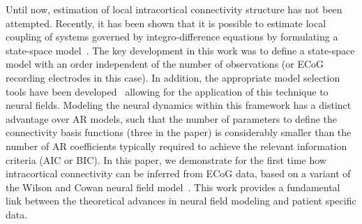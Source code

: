 \documentclass[onecolumn,draftcls]{IEEEtran}
\begin{document}
Until now, estimation of local intracortical connectivity structure has not been attempted. Recently, it has been shown that it is possible to estimate local coupling of systems governed by integro-difference equations by formulating a state-space model~\cite{Dewar2009}. The key development in this work was to define a state-space model with an order independent of the number of observations (or ECoG recording electrodes in this case). In addition, the appropriate model selection tools have been developed~\cite{Scerri2009} allowing for the application of this technique to neural fields. Modeling the neural dynamics within this framework has a distinct advantage over AR models, such that the number of parameters to define the connectivity basis functions (three in the paper) is considerably smaller than the number of AR coefficients typically required to achieve the relevant information criteria (AIC or BIC). In this paper, we demonstrate for the first time how intracortical connectivity can be inferred from ECoG data, based on a variant of the  Wilson and Cowan neural field model~\cite{Wilson1973}. This work provides a fundamental link between the theoretical advances in neural field modeling and patient specific data.
\end{document}
